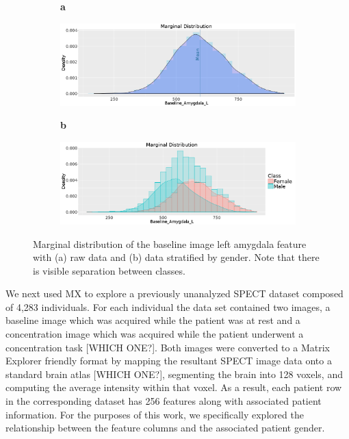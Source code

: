 \documentclass[12pt]{article}
\begin{document}
\begin{figure}[t]
	\centering
	\begin{subfigure}[t]{0.01\textwidth}
		\textbf{a}
	\end{subfigure}
	\begin{subfigure}[t]{0.48\textwidth}
		\includegraphics[width=\textwidth,valign=t]{Figures/Spect_Gender/NonClass_Baseline_Amygdala_L.png}
		\subcaption{}
		\label{fig:FigSpecNoClassMarginal}
	\end{subfigure}\hfill
	\begin{subfigure}[t]{0.01\textwidth}
		\textbf{b}
	\end{subfigure}
	\begin{subfigure}[t]{0.48\textwidth}
		\includegraphics[width=\textwidth,valign=t]{Figures/Spect_Gender/Baseline_Amygdala_L_Marginal.png}
		\subcaption{}
		\label{fig:FigSpecMarginal}
	\end{subfigure}
	\vspace{-1.5\baselineskip}
	\caption{Marginal distribution of the baseline image left amygdala feature with (a) raw data and (b) data stratified by gender. Note that there is visible separation between classes.}
	\label{fig:FigSpectMarginalCaption}
\end{figure}

We next used MX to explore a previously unanalyzed SPECT dataset composed of 4,283 individuals. For each individual the data set contained two images, a baseline image which was acquired while the patient was at rest and a concentration image which was acquired while the patient underwent a concentration task [WHICH ONE?]. Both images were converted to a Matrix Explorer friendly format by mapping the resultant SPECT image data onto a standard brain atlas [WHICH ONE?], segmenting the brain into 128 voxels, and computing the average intensity within that voxel. As a result, each patient row in the corresponding dataset has 256 features along with associated patient information. For the purposes of this work, we specifically explored the relationship between the feature columns and the associated patient gender. 
\end{document}
